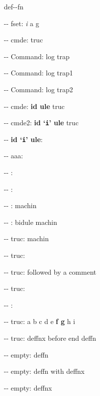 \documentclass{book}
\begin{document}
%
def{-}{-}fn

\hbox{}{-}{-} fset: \emph{i} a g


%
%
\hbox{}{-}{-} cmde: truc 


%
\hbox{}{-}{-} Command: log trap 


%
\hbox{}{-}{-} Command: log trap1 


%
\hbox{}{-}{-} Command: log trap2 


%
\hbox{}{-}{-} cmde: \textbf{id ule} truc


%
\hbox{}{-}{-} cmde2: \textbf{id `\texttt{i}' ule} truc


%
\hbox{}{-}{-} \textbf{id `\texttt{i}' ule}: 



\hbox{}{-}{-} aaa: 


\hbox{}{-}{-} : 


\hbox{}{-}{-} : 


\hbox{}{-}{-} : machin


%
\hbox{}{-}{-} : bidule machin


%
\hbox{}{-}{-} truc: machin


%
\hbox{}{-}{-} truc: 


\hbox{}{-}{-} truc: followed by a comment


%
\hbox{}{-}{-} truc: 


\hbox{}{-}{-} : 


\hbox{}{-}{-} truc: a b c d e \textbf{f g} h i


%
\hbox{}{-}{-} truc: deffnx before end deffn


%

\hbox{}{-}{-} empty: deffn


%

\hbox{}{-}{-} empty: deffn with deffnx


%
\hbox{}{-}{-} empty: deffnx


%
\end{document}
